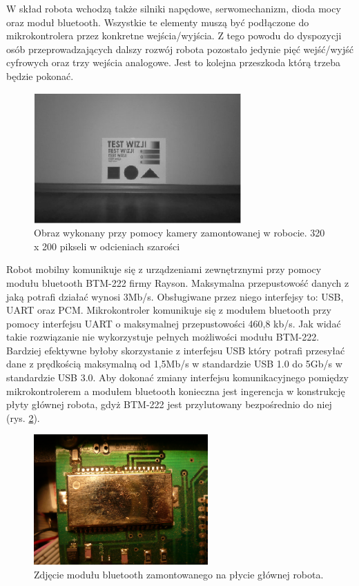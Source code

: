 W skład robota wchodzą także silniki napędowe, serwomechanizm, dioda mocy oraz
moduł bluetooth. Wszystkie te elementy muszą być podłączone do mikrokontrolera
przez konkretne wejścia/wyjścia. Z tego powodu do dyspozycji osób
przeprowadzających dalszy rozwój robota pozostało jedynie pięć wejść/wyjść
cyfrowych oraz trzy wejścia analogowe. Jest to kolejna przeszkoda którą trzeba
będzie pokonać.

\begin{figure}[!ht]
 \centering
 \includegraphics[height=50mm]{../images/ch02/320x200B&W.jpg}
 \caption{Obraz wykonany przy pomocy kamery zamontowanej w robocie. 320 x 200 pikseli w odcieniach szarości \cite{KmakMScThesis2009}}
 \label{fig:320x200BW}
\end{figure}

Robot mobilny komunikuje się z urządzeniami zewnętrznymi przy pomocy modułu
bluetooth BTM-222 firmy Rayson. Maksymalna przepustowość danych z jaką potrafi
działać wynosi 3Mb/s. Obsługiwane przez niego interfejsy to: USB, UART oraz PCM.
Mikrokontroler komunikuje się z modułem bluetooth przy pomocy interfejsu UART o
maksymalnej przepustowości 460,8 kb/s. Jak widać takie rozwiązanie nie
wykorzystuje pełnych możliwości modułu BTM-222. Bardziej efektywne byłoby
skorzystanie z interfejsu USB który potrafi przesyłać dane z prędkością
maksymalną od 1,5Mb/s w standardzie USB 1.0 do 5Gb/s w standardzie USB 3.0. Aby
dokonać zmiany interfejsu komunikacyjnego pomiędzy mikrokontrolerem a modułem
bluetooth konieczna jest ingerencja w konstrukcję płyty głównej robota, gdyż
BTM-222 jest przylutowany bezpośrednio do niej (rys. \ref{fig:BTM222}).

\begin{figure}[!ht]
 \centering
 \includegraphics[height=50mm]{../images/ch02/btm-222.jpg}
 \caption{Zdjęcie modułu bluetooth zamontowanego na płycie głównej robota.}
 \label{fig:BTM222}
\end{figure}

